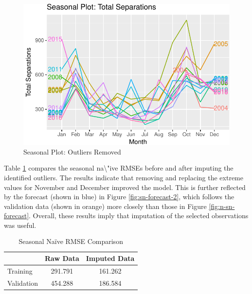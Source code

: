 \documentclass[12pt,letterpaper,toc=flat,oneside]{report}
\theoremstyle{definition}
\theoremstyle{definition}
\theoremstyle{definition}
\theoremstyle{remark}
\begin{document}
\begin{figure}[H]

{\centering \includegraphics{elliott-econometric-personnel-retention-18_files/figure-latex/response-season-plot-2-1} 

}

\caption{Seasonal Plot: Outliers Removed}\label{fig:response-season-plot-2}
\end{figure}

Table \ref{tab:season-rmse-compare} compares the seasonal
na\textbackslash{}"ive RMSEs before and after imputing the identified
outliers. The results indicate that removing and replacing the extreme
values for November and December improved the model. This is further
reflected by the forecast (shown in blue) in Figure
\ref{fig:sn-forecast-2}, which follows the validation data (shown in
orange) more closely than those in Figure \ref{fig:n-sn-forecast}.
Overall, these results imply that imputation of the selected
observations was useful.

\begin{table}[!h]

\caption{\label{tab:season-rmse-compare}Seasonal Na\"ive RMSE Comparison}
\centering
\begin{tabular}[t]{lcc}
\toprule
\bfseries{ } & \bfseries{Raw Data} & \bfseries{Imputed Data}\\
\midrule
Training & 291.791 & 161.262\\
Validation & 454.288 & 186.584\\
\bottomrule
\end{tabular}
\end{table}
\end{document}

